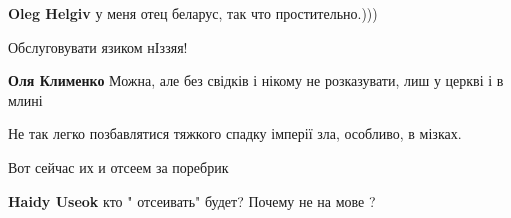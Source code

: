 \begin{itemize}
\begin{itemize}
\textbf{Oleg Helgiv} у меня отец беларус, так что простительно.)))
\end{itemize}

 
Обслуговувати язиком нІззяя!\Laughey[1.0][white]

\begin{itemize}
 
\textbf{Оля Клименко} Можна, але без свідків і нікому не розказувати, лиш у церкві і в млині
\end{itemize}

 
Не так легко позбавлятися тяжкого спадку імперії зла, особливо, в мізках.

 
Вот сейчас их и отсеем за поребрик

\begin{itemize}
 
\textbf{Haidy Useok} кто " отсеивать" будет? Почему не на мове ?

 

\end{itemize}
\end{itemize}
